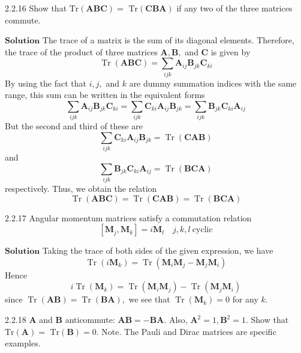 \documentclass{article}
\begin{document}
\begin{flushleft}
\begin{mybox}{2.2.16}
Show that $\text{Tr}(\mathbf{ABC})=$ $\text{Tr}(\mathbf{CBA})$ if any two of the three matrices commute.
\end{mybox}



$\boxed{\textbf{Solution}}$  The trace of a matrix is the sum of its diagonal elements. Therefore, the trace of the product of three matrices $\mathbf{A}, \mathbf{B},$ and $\mathbf{C}$ is
given by
$$
\operatorname{Tr}(\mathbf{A} \mathbf{B} \mathbf{C})=\sum_{i j k} \mathbf{A}_{i j} \mathbf{B}_{j k} \mathbf{C}_{k i}
$$
By using the fact that $i, j,$ and $k$ are dummy summation indices
with the same range, this sum can be written in the equivalent
forms
$$
\sum_{i j k} \mathbf{A}_{i j} \mathbf{B}_{j k} \mathbf{C}_{k i}=\sum_{i j k} \mathbf{C}_{k i} \mathbf{A}_{i j} \mathbf{B}_{j k}=\sum_{i j k} \mathbf{B}_{j k} \mathbf{C}_{k i} \mathbf{A}_{i j}
$$
But the second and third of these are
$$
\sum_{i j k} \mathbf{C}_{k i} \mathbf{A}_{i j} \mathbf{B}_{j k}=\operatorname{Tr}(\mathbf{C} \mathbf{A} \mathbf{B})
$$
and
$$
\sum_{i j k} \mathbf{B}_{j k} \mathbf{C}_{k i} \mathbf{A}_{i j}=\operatorname{Tr}(\mathbf{B} \mathbf{C} \mathbf{A})
$$
respectively. Thus, we obtain the relation
$$
\operatorname{Tr}(\mathbf{A} \mathbf{B} \mathbf{C})=\operatorname{Tr}(\mathbf{C} \mathbf{A} \mathbf{B})=\operatorname{Tr}(\mathbf{B} \mathbf{C} \mathbf{A})
$$


\begin{mybox}{2.2.17}
Angular momentum matrices satisfy a commutation relation
$$[\mathbf{M}_j,\mathbf{M}_k]=i\mathbf{M}_l \quad j,k,l \ \text{cyclic}$$
\end{mybox}



$\boxed{\textbf{Solution}}$  Taking the trace of both sides of the given expression, we have
$$
\operatorname{Tr}\left(i \mathbf{M}_{k}\right)=\operatorname{Tr}\left(\mathbf{M}_{i} \mathbf{M}_{j}-\mathbf{M}_{j} \mathbf{M}_{i}\right)
$$
Hence
$$
i \operatorname{Tr}\left(\mathbf{M}_{k}\right)=\operatorname{Tr}\left(\mathbf{M}_{i} \mathbf{M}_{j}\right)-\operatorname{Tr}\left(\mathbf{M}_{j} \mathbf{M}_{i}\right)
$$
since $\operatorname{Tr}(\mathbf{A}\mathbf{B})=\operatorname{Tr}(\mathbf{B}\mathbf{A}),$ we see that $\operatorname{Tr}\left(\mathbf{M}_{k}\right)=0$ for any $k .$



\begin{mybox}{2.2.18}
$\mathbf{A}$ and $\mathbf{B}$ anticommute: $\mathbf{A}\mathbf{B}=-\mathbf{B}\mathbf{A}$. Also, $\mathbf{A}^{2}=1, \mathbf{B}^{2}=1 .$ Show that $\text{Tr}(\mathbf{A})=$
$\text{Tr}(\mathbf{B})=0 .$
Note. The Pauli and Dirac matrices are specific examples.
\end{mybox}




\end{flushleft}
\end{document}
